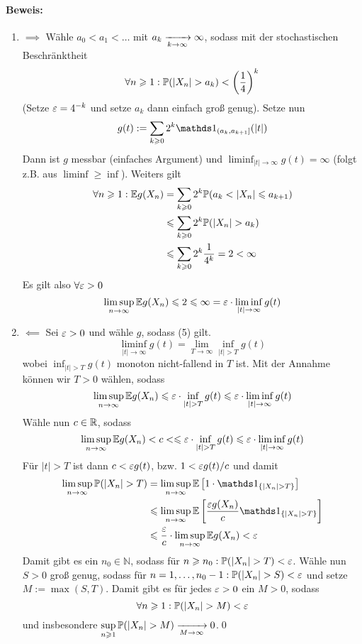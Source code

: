 \paragraph{Beweis:}
\begin{enumerate}[label=\Roman*.]
    \item $\implies$ \newline
    W\"ahle $a_0<a_1<\hdots$ mit $a_k\nto{}{k\to\infty}\infty$, sodass mit der stochastischen Beschr\"anktheit
    $$\forall n\geq1:\Pp(|X_n|>a_k)<\left(\frac{1}{4}\right)^k$$
    (Setze $\varepsilon=4^{-k}$ und setze $a_k$ dann einfach gro\ss{} genug). Setze nun 
    $$g(t):=\sum_{k\geq0}2^k\ind{(a_k,a_{k+1}]}(|t|)$$
    Dann ist $g$ messbar (einfaches Argument) und $\displaystyle\liminf_{|t|\to\infty}g(t)=\infty$ (folgt z.B. aus $\liminf\geq\inf$). Weiters gilt
    \begin{align*}
        \forall n\geq1:\E g(X_n)&=\sum_{k\geq0}2^k\Pp(a_k<|X_n|\leq a_{k+1})\\
        &\leq\sum_{k\geq0}2^k\Pp(|X_n|>a_k)\\
        &\leq\sum_{k\geq0}2^k\frac{1}{4^k}=2<\infty
    \end{align*}
    Es gilt also $\forall\varepsilon>0$
    $$\limsup_{n\to\infty}\mathbb{E} g(X_n)\leqslant2\leqslant\infty=\varepsilon\cdot\liminf_{|t|\to\infty}g(t)$$
    \item $\impliedby$ \newline
    Sei $\varepsilon>0$ und w\"ahle $g$, sodass (5) gilt. 
    $$\liminf_{|t|\to\infty}g(t)=\lim_{T\to\infty}\inf_{|t|>T}g(t)$$
    wobei $\inf_{|t|>T}g(t)$ monoton nicht-fallend in $T$ ist. Mit der Annahme k\"onnen wir $T>0$ w\"ahlen, sodass
    $$\limsup_{n\to\infty}\E g(X_n)\leq\eps\cdot\inf_{|t|>T}g(t)\leq\eps\cdot\liminf_{|t|\to\infty}g(t)$$
    W\"ahle nun $c\in\mathbb{R}$, sodass 
    $$\limsup_{n\to\infty}\E g(X_n)<c<\leq\eps\cdot\inf_{|t|>T}g(t)\leq\eps\cdot\liminf_{|t|\to\infty}g(t)$$
    F\"ur $|t|>T$ ist dann $c<\varepsilon g(t)$, bzw. $1<\varepsilon g(t)/c$ und damit
    \begin{align*}
        \limsup_{n\to\infty}\Pp(|X_n|>T)&=\limsup_{n\to\infty}\E\left[1\cdot\ind{\{|X_n|>T\}}\right]\\
        &\leq\limsup_{n\to\infty}\E\left[\dfrac{\eps g(X_n)}{c}\ind{\{|X_n|>T\}}\right]\\
        &\leq\dfrac{\eps}{c}\cdot\limsup_{n\to\infty}\E g(X_n)<\eps
    \end{align*}
    Damit gibt es ein $n_0\in\mathbb{N}$, sodass f\"ur $n\geq n_0: \Pp(|X_n|>T)<\eps$. W\"ahle nun $S>0$ gro\ss{} genug, sodass f\"ur $n=1,\hdots,n_0-1: \Pp(|X_n|>S)<\eps$ und setze $M:=\max(S,T)$. Damit gibt es f\"ur jedes $\varepsilon>0$ ein $M>0$, sodass
    $$\forall n\geq1: \Pp(|X_n|>M)<\eps$$
    und insbesondere $\displaystyle\sup_{n\geq1}\Pp(|X_n|>M)\nto{}{M\to\infty}0$.\qed
\end{enumerate}


